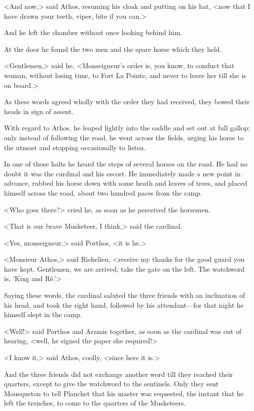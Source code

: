<And now,> said Athos, resuming his cloak and putting on his hat, <now that I have drawn your teeth, viper, bite if you can.> 

And he left the chamber without once looking behind him. 

At the door he found the two men and the spare horse which they held. 

<Gentlemen,> said he, <Monseigneur's order is, you know, to conduct that woman, without losing time, to Fort La Pointe, and never to leave her till she is on board.> 

As these words agreed wholly with the order they had received, they bowed their heads in sign of assent. 

With regard to Athos, he leaped lightly into the saddle and set out at full gallop; only instead of following the road, he went across the fields, urging his horse to the utmost and stopping occasionally to listen. 

In one of those halts he heard the steps of several horses on the road. He had no doubt it was the cardinal and his escort. He immediately made a new point in advance, rubbed his horse down with some heath and leaves of trees, and placed himself across the road, about two hundred paces from the camp. 

<Who goes there?> cried he, as soon as he perceived the horsemen. 

<That is our brave Musketeer, I think,> said the cardinal. 

<Yes, monseigneur,> said Porthos, <it is he.> 

<Monsieur Athos,> said Richelieu, <receive my thanks for the good guard you have kept. Gentlemen, we are arrived; take the gate on the left. The watchword is, 'King and Ré.'> 

Saying these words, the cardinal saluted the three friends with an inclination of his head, and took the right hand, followed by his attendant—for that night he himself slept in the camp. 

<Well!> said Porthos and Aramis together, as soon as the cardinal was out of hearing, <well, he signed the paper she required!> 

<I know it,> said Athos, coolly, <since here it is.> 

And the three friends did not exchange another word till they reached their quarters, except to give the watchword to the sentinels. Only they sent Mousqueton to tell Planchet that his master was requested, the instant that he left the trenches, to come to the quarters of the Musketeers. 

